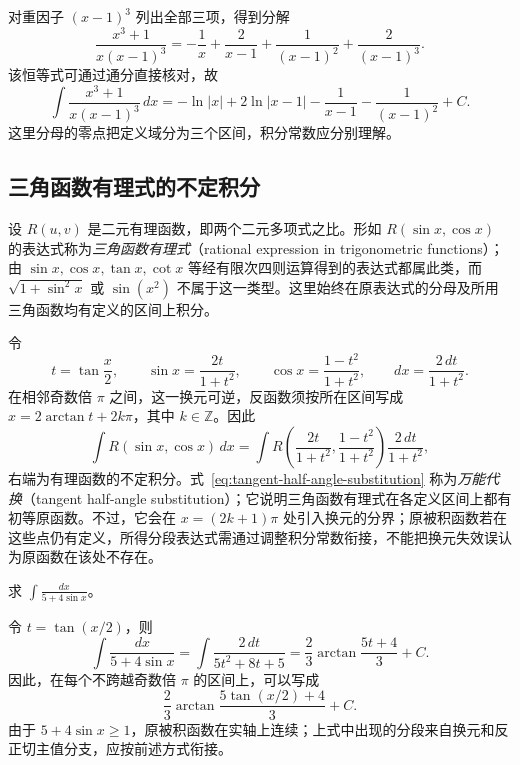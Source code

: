 \begin{solve}
对重因子 $(x-1)^3$ 列出全部三项，得到分解
\[
    \frac{x^3+1}{x(x-1)^3}
      =-\frac1x+\frac2{x-1}+\frac1{(x-1)^2}+\frac2{(x-1)^3}.
\]
该恒等式可通过通分直接核对，故
\[
    \int\frac{x^3+1}{x(x-1)^3}\,dx
      =-\ln|x|+2\ln|x-1|-\frac1{x-1}-\frac1{(x-1)^2}+C.
\]
这里分母的零点把定义域分为三个区间，积分常数应分别理解。
\end{solve}

\subsection{三角函数有理式的不定积分}
\label{subsec:integrals-of-rational-trigonometric-expressions}

设 $R(u,v)$ 是二元有理函数，即两个二元多项式之比。形如 $R(\sin x,\cos x)$ 的表达式称为\emph{三角函数有理式}（rational expression in trigonometric functions）；由 $\sin x,\cos x,\tan x,\cot x$ 等经有限次四则运算得到的表达式都属此类，而 $\sqrt{1+\sin^2x}$ 或 $\sin(x^2)$ 不属于这一类型。这里始终在原表达式的分母及所用三角函数均有定义的区间上积分。

令
\begin{equation}
    t=\tan\frac x2,\qquad
    \sin x=\frac{2t}{1+t^2},\qquad
    \cos x=\frac{1-t^2}{1+t^2},\qquad
    dx=\frac{2\,dt}{1+t^2}.
    \label{eq:tangent-half-angle-substitution}
\end{equation}
在相邻奇数倍 $\pi$ 之间，这一换元可逆，反函数须按所在区间写成 $x=2\arctan t+2k\pi$，其中 $k\in\mathbb{Z}$。因此
\begin{equation}
    \int R(\sin x,\cos x)\,dx
      =\int R\left(\frac{2t}{1+t^2},\frac{1-t^2}{1+t^2}\right)
             \frac{2\,dt}{1+t^2},
    \label{eq:rationalization-of-trigonometric-integral}
\end{equation}
右端为有理函数的不定积分。式~\eqref{eq:tangent-half-angle-substitution} 称为\emph{万能代换}（tangent half-angle substitution）；它说明三角函数有理式在各定义区间上都有初等原函数。不过，它会在 $x=(2k+1)\pi$ 处引入换元的分界；原被积函数若在这些点仍有定义，所得分段表达式需通过调整积分常数衔接，不能把换元失效误认为原函数在该处不存在。

\begin{example}
\label{ex:tangent-half-angle-integral}
求 $\displaystyle\int\frac{dx}{5+4\sin x}$。
\end{example}

\begin{solve}
令 $t=\tan(x/2)$，则
\[
    \int\frac{dx}{5+4\sin x}
      =\int\frac{2\,dt}{5t^2+8t+5}
      =\frac23\arctan\frac{5t+4}{3}+C.
\]
因此，在每个不跨越奇数倍 $\pi$ 的区间上，可以写成
\[
    \frac23\arctan\frac{5\tan(x/2)+4}{3}+C.
\]
由于 $5+4\sin x\geq1$，原被积函数在实轴上连续；上式中出现的分段来自换元和反正切主值分支，应按前述方式衔接。
\end{solve}

